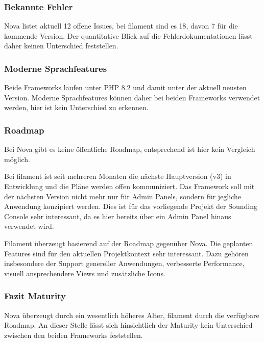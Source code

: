 \subsubsection{Bekannte Fehler}
Nova listet aktuell 12 offene Issues, bei filament sind es 18, davon 7 für die kommende Version.
Der quantitative Blick auf die Fehlerdokumentationen lässt daher keinen Unterschied feststellen.

\subsubsection{Moderne Sprachfeatures}
Beide Frameworks laufen unter PHP 8.2 und damit unter der aktuell neusten Version.
Moderne Sprachfeatures können daher bei beiden Frameworks verwendet werden, hier ist kein Unterschied zu erkennen.

\subsubsection{Roadmap}
Bei Nova gibt es keine öffentliche Roadmap, entsprechend ist hier kein Vergleich möglich.

Bei filament ist seit mehreren Monaten die nächste Hauptversion (v3) in Entwicklung\cite{filament-v3-plans} und die Pläne werden offen kommuniziert.
Das Framework soll mit der nächsten Version nicht mehr nur für Admin Panels, sondern für jegliche Anwendung konzipiert werden\cite{filament-v3}.
Dies ist für das vorliegende Projekt der Sounding Console sehr interessant, da es hier bereits über ein Admin Panel hinaus verwendet wird.

Filament überzeugt basierend auf der Roadmap gegenüber Nova.
Die geplanten Features sind für den aktuellen Projektkontext sehr interessant.
Dazu gehören insbesondere der Support genereller Anwendungen, verbesserte Performance, visuell ansprechendere Views und zusätzliche Icons.

\subsubsection{Fazit Maturity}
Nova überzeugt durch ein wesentlich höheres Alter, filament durch die verfügbare Roadmap.
An dieser Stelle lässt sich hinsichtlich der Maturity kein Unterschied zwischen den beiden Frameworks feststellen.
